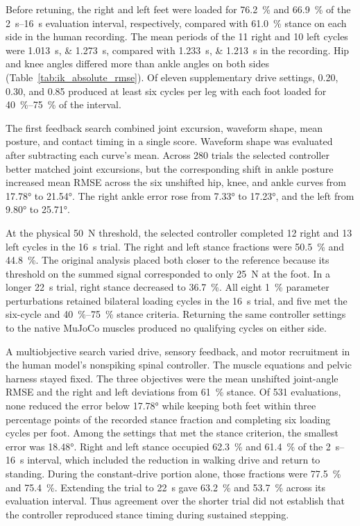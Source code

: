 Before retuning, the right and left feet were loaded for \qty{76.2}{\percent} and \qty{66.9}{\percent} of the \qtyrange{2}{16}{\second} evaluation interval, respectively, compared with \qty{61.0}{\percent} stance on each side in the human recording. The mean periods of the 11 right and 10 left cycles were \qtylist{1.013;1.273}{\second}, compared with \qtylist{1.233;1.213}{\second} in the recording. Hip and knee angles differed more than ankle angles on both sides (Table~\ref{tab:ik_absolute_rmse}). Of eleven supplementary drive settings, 0.20, 0.30, and 0.85 produced at least six cycles per leg with each foot loaded for \qtyrange{40}{75}{\percent} of the interval.

The first feedback search combined joint excursion, waveform shape, mean posture, and contact timing in a single score. Waveform shape was evaluated after subtracting each curve's mean. Across 280 trials the selected controller better matched joint excursions, but the corresponding shift in ankle posture increased mean RMSE across the six unshifted hip, knee, and ankle curves from \ang{17.78} to \ang{21.54}. The right ankle error rose from \ang{7.33} to \ang{17.23}, and the left from \ang{9.80} to \ang{25.71}.

At the physical \qty{50}{\newton} threshold, the selected controller completed 12 right and 13 left cycles in the \qty{16}{\second} trial. The right and left stance fractions were \qty{50.5}{\percent} and \qty{44.8}{\percent}. The original analysis placed both closer to the reference because its threshold on the summed signal corresponded to only \qty{25}{\newton} at the foot. In a longer \qty{22}{\second} trial, right stance decreased to \qty{36.7}{\percent}. All eight \qty{1}{\percent} parameter perturbations retained bilateral loading cycles in the \qty{16}{\second} trial, and five met the six-cycle and \qtyrange{40}{75}{\percent} stance criteria. Returning the same controller settings to the native MuJoCo muscles produced no qualifying cycles on either side.

A multiobjective search varied drive, sensory feedback, and motor recruitment in the human model's nonspiking spinal controller. The muscle equations and pelvic harness stayed fixed. The three objectives were the mean unshifted joint-angle RMSE and the right and left deviations from \qty{61}{\percent} stance. Of 531 evaluations, none reduced the error below \ang{17.78} while keeping both feet within three percentage points of the recorded stance fraction and completing six loading cycles per foot. Among the settings that met the stance criterion, the smallest error was \ang{18.48}. Right and left stance occupied \qty{62.3}{\percent} and \qty{61.4}{\percent} of the \qtyrange{2}{16}{\second} interval, which included the reduction in walking drive and return to standing. During the constant-drive portion alone, those fractions were \qty{77.5}{\percent} and \qty{75.4}{\percent}. Extending the trial to \qty{22}{\second} gave \qty{63.2}{\percent} and \qty{53.7}{\percent} across its evaluation interval. Thus agreement over the shorter trial did not establish that the controller reproduced stance timing during sustained stepping.

